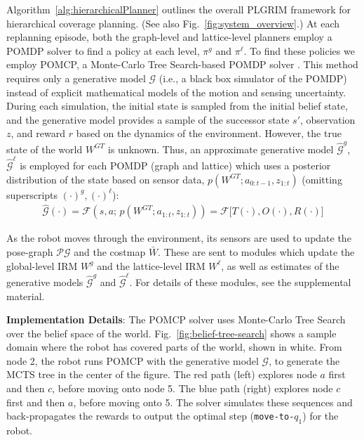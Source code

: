 \documentclass[letterpaper]{article} %
\newcommand{\ph}[1]{{\textbf{#1}:}} %
\begin{document}
Algorithm~\ref{alg:hierarchicalPlanner} outlines the overall PLGRIM framework for hierarchical coverage planning.  (See also Fig.~\ref{fig:system_overview}.)
At each replanning episode, both the graph-level and lattice-level planners employ a POMDP solver to find a policy at each level, $\pi^g$ and $\pi^\ell$.  To find these policies we employ POMCP, a Monte-Carlo Tree Search-based POMDP solver \cite{silver2010monte}.  This method requires only a generative model $\mathcal{G}$  (i.e., a black box simulator of the POMDP) instead of explicit mathematical models of the motion and sensing uncertainty. During each simulation, the initial state is sampled from the initial belief state, and the generative model provides a sample of the successor state $s'$, observation $z$, and reward $r$ based on the dynamics of the environment. However, the true state of the world $W^{GT}$ is unknown.  Thus, an approximate generative model $\hat{\mathcal{G}}^g$, $\hat{\mathcal{G}}^\ell$ is employed for each POMDP (graph and lattice) which uses a posterior distribution of the state  based on sensor data, $p(W^{GT}; a_{0:t-1}, z_{1:t})$ (omitting superscripts $(\cdot)^g, (\cdot)^\ell$):
\begin{align}
    \hat{\mathcal{G}}(\cdot) = \mathcal{F}(s, a; \, p(W^{GT}; a_{1:t}, z_{1:t})) = \mathcal{F}\big[T(\cdot), O(\cdot), R(\cdot)\big]%
\end{align}

As the robot moves through the environment, its sensors are used to update the pose-graph $\mathcal{PG}$ and the %
costmap $\bar{W}$.  These are sent to modules which update the global-level IRM $W^g$ and the lattice-level IRM $W^\ell$, as well as estimates of the generative models $\hat{\mathcal{G}}^g$ and $\hat{\mathcal{G}}^\ell$. For details of these modules, see the supplemental material.

\ph{Implementation Details}
The POMCP solver uses Monte-Carlo Tree Search over the belief space of the world. Fig.~\ref{fig:belief-tree-search} shows a sample domain where the robot has covered parts of the world, shown in white. From node 2, the robot runs POMCP with the generative model $\mathcal{G}$, to generate the MCTS tree in the center of the figure. The red path (left) explores node $a$ first and then $c$, before moving onto node 5. The blue path (right) explores node $c$ first and then $a$, before moving onto 5. The solver simulates these sequences and back-propagates the rewards to output the optimal step (\texttt{move-to-$q_1$}) for the robot.
\end{document}
